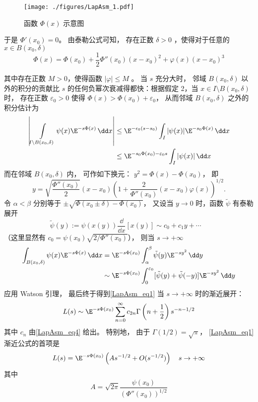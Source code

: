 \begin{figure}[ht]
  \centering
  \texttt{[image: ./figures/LapAsm\_1.pdf]}
  \caption{函数 $\Phi(x)$ 示意图} \label{LapAsm_fig1}
\end{figure}

于是 $\Phi'(x_0)=0$。 由泰勒公式可知， 存在正数 $\delta>0$ ，使得对于任意的 $x\in B(x_0,\delta)$  
\[
  \Phi(x)=\Phi(x_0)+\frac{1}{2}\Phi''(x_0)(x-x_0)^2+\varphi(x)(x-x_0)^3
\]

其中存在正数 $M>0$，使得函数 $|\varphi|\leq M$ 。 当 $s$ 充分大时， 邻域 $B(x_0,\delta)$ 以外的积分的贡献比 $s$ 的任何负幂次衰减得都快：根据假定 2，当 $x\in I\setminus B(x_0,\delta)$ 时， 存在正数 $\varepsilon_0>0$ 使得 $\Phi(x)>\Phi(x_0)+\varepsilon_0$， 从而邻域 $B(x_0,\delta)$ 之外的积分估计为
\begin{align*}
    \left|\int\limits_{I\setminus B(x_0,\delta)}\psi(x)\E^{-s\Phi(x)}\,\dd x\right|
    &\leq \E^{-\epsilon_0(s-s_0)}\int_I|\psi(x)|\E^{-s_0\Phi(x)}\,\dd x\nonumber\\
    &\leq \E^{-s_0\Phi(x_0)-\varepsilon_0s}\int_{I}|\psi(x)|\,\dd x\nonumber
\end{align*}
而在邻域 $B(x_0,\delta)$ 内， 可作如下换元： $y^2=\Phi(x)-\Phi(x_0)$， 即
\[
  y=\sqrt{\frac{\Phi''(x_0)}{2}}(x-x_0)\left(1+\frac{2}{\Phi''(x_0)}(x-x_0)\varphi(x)\right)^{1/2}.
\]
令 $\alpha<\beta$ 分别等于 $\pm\sqrt{\Phi(x_0\pm\delta)-\Phi(x_0)}$， 又设当 $y\to0$ 时，函数 $\tilde{\psi}$ 有泰勒展开
\begin{equation}\label{LapAsm_eq4}
  \tilde{\psi}(y):=\psi(x(y))\frac{\dd}{\dd x}[x(y)]\sim c_0+c_1y+\cdots \quad 
  \end{equation}
  （这里显然有 $c_0=\psi(x_0)\sqrt{2/\Phi''(x_0)}$）， 则当 $s\to+\infty$
  $$
  \begin{aligned}
  \int_{B(x_0,\delta)}\psi(x)\E^{-s\Phi(x)}\,\dd x
  &=\E^{-s\Phi(x_0)}\int_{\alpha}^{\beta}\tilde \psi(y)\E^{-sy^2}\,\dd y\\
  &\sim\E^{-s\Phi(x_0)}\int_{0}^{\varepsilon_0}[\tilde \psi(y)+\tilde \psi(-y)]\E^{-sy^2}\,\dd y
\end{aligned}
$$
应用 Watson 引理， 最后终于得到\autoref{LapAsm_eq1} 当 $s\to+\infty$ 时的渐近展开：
\begin{equation}\label{LapAsm_eq5}
  L(s)\sim \E^{-s\Phi(x_0)}\sum_{n=0}^\infty c_{2n}\Gamma\left(n+\frac{1}{2}\right)s^{-n-1/2}
\end{equation}
其中 $c_n$ 由\autoref{LapAsm_eq4} 给出。 特别地， 由于 $\Gamma(1/2)=\sqrt{\pi}$， \autoref{LapAsm_eq1} 渐近公式的首项是
\[
  L(s)=\E^{-s\Phi(x_0)}\left(As^{-1/2}+O(s^{-1/2})\right)\quad s\to+\infty
\]
其中
\[
  A=\sqrt{2\pi}\frac{\psi(x_0)}{(\Phi''(x_0))^{1/2}}
\]

